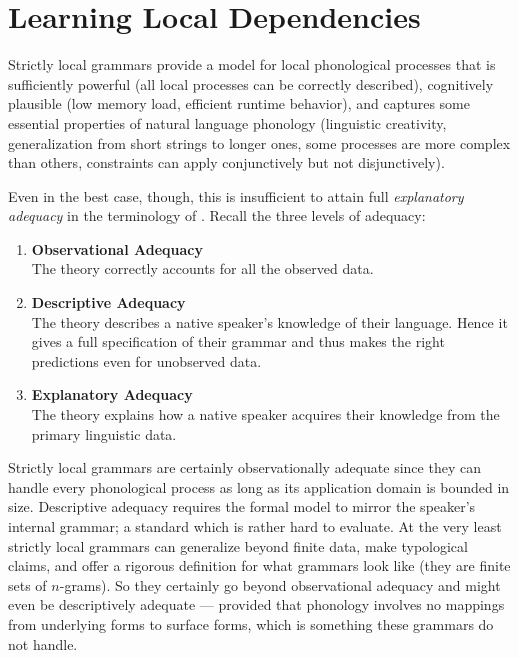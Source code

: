 \chapter{Learning Local Dependencies}
\label{cha:LearnSL}

Strictly local grammars provide a model for local phonological processes that is sufficiently powerful (all local processes can be correctly described), cognitively plausible (low memory load, efficient runtime behavior), and captures some essential properties of natural language phonology (linguistic creativity, generalization from short strings to longer ones, some processes are more complex than others, constraints can apply conjunctively but not disjunctively).

Even in the best case, though, this is insufficient to attain full \emph{explanatory adequacy} in the terminology of \citet{Chomsky65}.
Recall the three levels of adequacy:
%
\begin{enumerate}
    \item \textbf{Observational Adequacy}\\
        The theory correctly accounts for all the observed data.
    \item \textbf{Descriptive Adequacy}\\
        The theory describes a native speaker's knowledge of their language.
        Hence it gives a full specification of their grammar and thus makes the right predictions even for unobserved data.
    \item \textbf{Explanatory Adequacy}\\
        The theory explains how a native speaker acquires their knowledge from the primary linguistic data.
\end{enumerate}
%
Strictly local grammars are certainly observationally adequate since they can handle every phonological process as long as its application domain is bounded in size.
Descriptive adequacy requires the formal model to mirror the speaker's internal grammar; a standard which is rather hard to evaluate.
At the very least strictly local grammars can generalize beyond finite data, make typological claims, and offer a rigorous definition for what grammars look like (they are finite sets of $n$-grams).
So they certainly go beyond observational adequacy and might even be descriptively adequate --- provided that phonology involves no mappings from underlying forms to surface forms, which is something these grammars do not handle.

